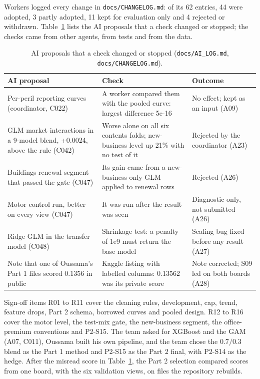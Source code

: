 Workers logged every change in \texttt{docs/CHANGELOG.md}: of its 62 entries, 44 were adopted, 3 partly adopted, 11
kept for evaluation only and 4 rejected or withdrawn. Table~\ref{ov:tab-ai} lists the AI proposals that a check changed
or stopped; the checks came from other agents, from tests and from the data.

\begin{table}[h]
\centering
\small
\begin{tabular}{p{4.2cm}p{6.0cm}p{4.0cm}}
\hline
AI proposal & Check & Outcome\\
\hline
Per-peril reporting curves (coordinator, C022) & A worker compared them with the pooled curve: largest difference 5e-16 & No effect; kept as an input (A09)\\
GLM market interactions in a 9-model blend, +0.0024, above the rule (C042) & Worse alone on all six contents folds; new-business level up 21\% with no test of it & Rejected by the coordinator (A23)\\
Buildings renewal segment that passed the gate (C047) & Its gain came from a new-business-only GLM applied to renewal rows & Rejected (A26)\\
Motor control run, better on every view (C047) & It was run after the result was seen & Diagnostic only, not submitted (A26)\\
Ridge GLM in the transfer model (C048) & Shrinkage test: a penalty of 1e9 must return the base model & Scaling bug fixed before any result (A27)\\
Note that one of Oussama's Part 1 files scored 0.1356 in public & Kaggle listing with labelled columns: 0.13562 was its private score & Note corrected; S09 led on both boards (A28)\\
\hline
\end{tabular}
\caption{AI proposals that a check changed or stopped (\texttt{docs/AI\_LOG.md}, \texttt{docs/CHANGELOG.md}).}
\label{ov:tab-ai}
\end{table}

Sign-off items R01 to R11 cover the cleaning rules, development, cap, trend, feature drops, Part 2 schema, borrowed
curves and pooled design. R12 to R16 cover the motor level, the test-mix gate, the new-business segment, the
office-premium conventions and P2-S15. The team asked for XGBoost and the GAM (A07, C011), Oussama built his own
pipeline, and the team chose the $0.7/0.3$ blend as the Part 1 method and P2-S15 as the Part 2 final, with P2-S14
as the hedge. After the misread score in Table~\ref{ov:tab-ai}, the Part 2 selection compared scores from one board, with
the six validation views, on files the repository rebuilds.
